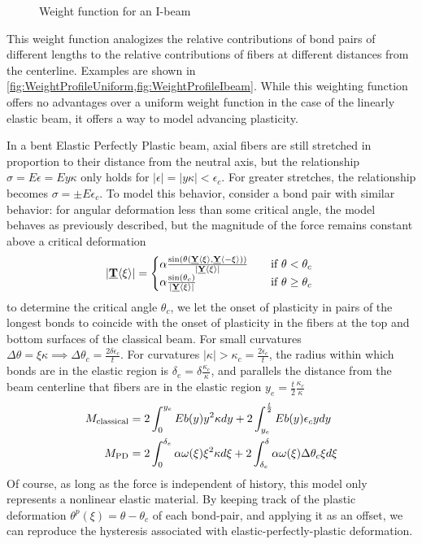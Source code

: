 \documentclass[5p,twocolumn]{elsarticle}
\newcommand{\diagrampath}{./diagrams/}
\newcommand\vstate[3]{%
	\mathbf{\underline{#1}}%
	\ifstrempty{#2}{}{[#2]}%
	\ifstrempty{#3}{}{\langle #3 \rangle}}
\begin{document}
\begin{figure}
  \centering
  \subinputfrom{\diagrampath}{WeightProfile_Ibeam.eps_tex}
\caption{Weight function for an I-beam}
\label{fig:WeightProfileIbeam}
\end{figure}
%
This weight function analogizes the relative contributions of bond pairs of different lengths to the relative contributions of fibers at different distances from the centerline. 
Examples are shown in \cref{fig:WeightProfileUniform,fig:WeightProfileIbeam}.
    While this weighting function offers no advantages over a uniform weight function in the case of the linearly elastic beam, it offers a way to model advancing plasticity.

In a bent Elastic Perfectly Plastic beam, axial fibers are still stretched in proportion to their distance from the neutral axis, but the relationship \(\sigma = E\epsilon = Ey\kappa\) only holds for \(|\epsilon| = |y\kappa| < \epsilon_c\). 
For greater stretches, the relationship becomes \(\sigma = \pm E\epsilon_c \). 
To model this behavior, consider a bond pair with similar behavior: for angular deformation less than some critical angle, the model behaves as previously described, but the magnitude of the force remains constant above a critical deformation
%
\[ 
|\vstate{T}{}{\xi}| = 
  \begin{cases}
    \alpha \frac{\sin(\theta(\vstate{Y}{}{\xi},\vstate{Y}{}{\mathbf{-\xi}}))}{|\vstate{Y}{}{\xi}|} & \quad \text{if } \theta < \theta_c\\
    \alpha \frac{\sin(\theta_c)}{|\vstate{Y}{}{\xi}|} & \quad \text{if } \theta \geq \theta_c\
  \end{cases}
\]
%
to determine the critical angle \(\theta_c\), we let the onset of plasticity in pairs of the longest bonds to coincide with the onset of plasticity in the fibers at the top and bottom surfaces of the classical beam. 
For small curvatures \(\Delta\theta = \xi\kappa\implies\Delta\theta_c = \frac{2\delta\epsilon_c}{t}\). 
For curvatures \(|\kappa| > \kappa_c=\frac{2\epsilon_c}{t}\), the radius within which bonds are in the elastic region is \(\delta_e = \delta \frac{\kappa_c}{\kappa}\), and parallels the distance from the beam centerline that fibers are in the elastic region \(y_e = \frac{t}{2} \frac{\kappa_c}{\kappa}\)
%
\begin{align}
  M_\text{classical} &= 2 \int_{0}^{y_e}E b(y)y^2 \kappa dy +2 \int_{y_e}^{\frac{t}{2}}E b(y) \epsilon_c y dy\notag \\
  M_\text{PD} &= 2 \int_{0}^{\delta_e}\alpha \omega(\xi) \xi^2 \kappa d\xi +2 \int_{\delta_e}^{\delta}\alpha \omega(\xi) \Delta\theta_c \xi d\xi \notag
\end{align}
%
Of course, as long as the force is independent of history, this model only represents a nonlinear elastic material. 
By keeping track of the plastic deformation \(\theta^p (\xi) = \theta-\theta_c\) of each bond-pair, and applying it as an offset, we can reproduce the hysteresis associated with elastic-perfectly-plastic deformation.
%
%
\end{document}
